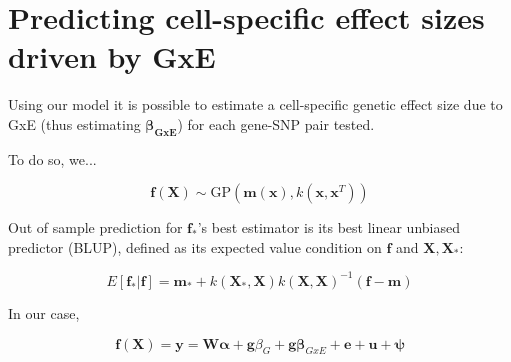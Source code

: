 





\clearpage

\section{Predicting cell-specific effect sizes driven by GxE}

Using our model it is possible to estimate a cell-specific genetic effect size due to GxE (thus estimating $\boldsymbol{\beta_{GxE}}$) for each gene-SNP pair tested.

To do so, we...
 

\begin{equation}
    \mathbf{f}(\mathbf{X}) \sim \mathrm{GP}(\mathbf{m}(\mathbf{x}), k(\mathbf{x},\mathbf{x}^T))
\end{equation}

Out of sample prediction for $\mathbf{f}_*$'s best estimator is its best linear unbiased predictor (BLUP), defined as its expected value condition on $\mathbf{f}$ and $\mathbf{X},\mathbf{X}_*$:

\begin{equation}
    E[\mathbf{f}_*|\mathbf{f}] = \mathbf{m}_* +k(\mathbf{X}_*,\mathbf{X})k(\mathbf{X},\mathbf{X})^{-1}(\mathbf{f}-\mathbf{m})
\end{equation}

In our case,

\begin{equation}
    \mathbf{f}(\mathbf{X}) = \mathbf{y} = \mathbf{W}\boldsymbol{\alpha}+\mathbf{g}\beta_G+\mathbf{g}\boldsymbol{\beta}_{GxE}+\mathbf{e} + \mathbf{u} + \boldsymbol{\psi}
\end{equation}

